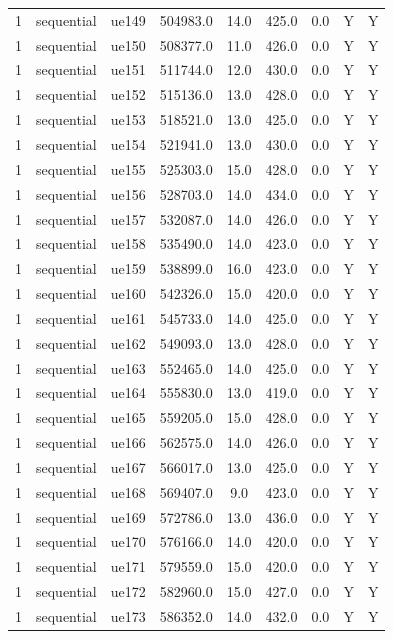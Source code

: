 \begin{table}[ht]
\begin{tabular}{|c|c|c|c|c|c|c|c|c|}
1 & sequential & ue149 & 504983.0 & 14.0 & 425.0 & 0.0 & Y & Y \\
1 & sequential & ue150 & 508377.0 & 11.0 & 426.0 & 0.0 & Y & Y \\
1 & sequential & ue151 & 511744.0 & 12.0 & 430.0 & 0.0 & Y & Y \\
1 & sequential & ue152 & 515136.0 & 13.0 & 428.0 & 0.0 & Y & Y \\
1 & sequential & ue153 & 518521.0 & 13.0 & 425.0 & 0.0 & Y & Y \\
1 & sequential & ue154 & 521941.0 & 13.0 & 430.0 & 0.0 & Y & Y \\
1 & sequential & ue155 & 525303.0 & 15.0 & 428.0 & 0.0 & Y & Y \\
1 & sequential & ue156 & 528703.0 & 14.0 & 434.0 & 0.0 & Y & Y \\
1 & sequential & ue157 & 532087.0 & 14.0 & 426.0 & 0.0 & Y & Y \\
1 & sequential & ue158 & 535490.0 & 14.0 & 423.0 & 0.0 & Y & Y \\
1 & sequential & ue159 & 538899.0 & 16.0 & 423.0 & 0.0 & Y & Y \\
1 & sequential & ue160 & 542326.0 & 15.0 & 420.0 & 0.0 & Y & Y \\
1 & sequential & ue161 & 545733.0 & 14.0 & 425.0 & 0.0 & Y & Y \\
1 & sequential & ue162 & 549093.0 & 13.0 & 428.0 & 0.0 & Y & Y \\
1 & sequential & ue163 & 552465.0 & 14.0 & 425.0 & 0.0 & Y & Y \\
1 & sequential & ue164 & 555830.0 & 13.0 & 419.0 & 0.0 & Y & Y \\
1 & sequential & ue165 & 559205.0 & 15.0 & 428.0 & 0.0 & Y & Y \\
1 & sequential & ue166 & 562575.0 & 14.0 & 426.0 & 0.0 & Y & Y \\
1 & sequential & ue167 & 566017.0 & 13.0 & 425.0 & 0.0 & Y & Y \\
1 & sequential & ue168 & 569407.0 & 9.0 & 423.0 & 0.0 & Y & Y \\
1 & sequential & ue169 & 572786.0 & 13.0 & 436.0 & 0.0 & Y & Y \\
1 & sequential & ue170 & 576166.0 & 14.0 & 420.0 & 0.0 & Y & Y \\
1 & sequential & ue171 & 579559.0 & 15.0 & 420.0 & 0.0 & Y & Y \\
1 & sequential & ue172 & 582960.0 & 15.0 & 427.0 & 0.0 & Y & Y \\
1 & sequential & ue173 & 586352.0 & 14.0 & 432.0 & 0.0 & Y & Y \\

\end{tabular}
\end{table}
